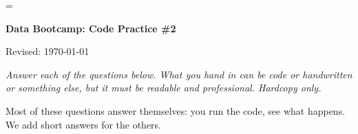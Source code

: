 \documentclass[11pt]{exam}
\begin{document}
\parskip=\bigskipamount
\parindent=0.0in
\thispagestyle{empty}


\bigskip\bigskip
\centerline{\Large \bf Data Bootcamp:  Code Practice \#2}
\centerline{Revised: \today}

\medskip
{\it Answer each of the questions below.
What you hand in can be code or handwritten or something else,
but it must be readable and professional.
Hardcopy only.}

\begin{solution}
Most of these questions answer themselves:  you run the code,
see what happens.  We add short answers for the others.
\end{solution}

\begin{comment}
x = True
x*1
int(x) 
float(x) 
\end{comment} 
\end{document}
